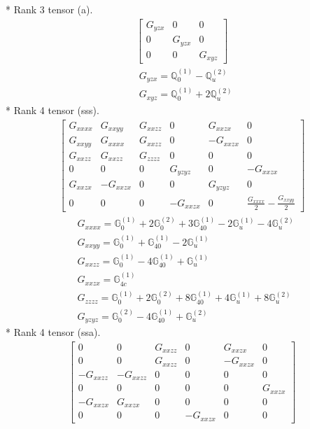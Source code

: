 \documentclass[fleqn,8pt,landscape]{jsarticle}
\begin{document}
* Rank 3 tensor (a).
\begin{align*}
\begin{bmatrix} G_{yzx} & 0 & 0 \\ 0 & G_{yzx} & 0 \\ 0 & 0 & G_{xyz} \end{bmatrix}
\end{align*}
\begin{align*}
& G_{yzx} = \mathbb{Q}_{0}^{(1)} - \mathbb{Q}_{u}^{(2)} \\
& G_{xyz} = \mathbb{Q}_{0}^{(1)} + 2 \mathbb{Q}_{u}^{(2)}
\end{align*}
* Rank 4 tensor (sss).
\begin{align*}
\begin{bmatrix} G_{xxxx} & G_{xxyy} & G_{xxzz} & 0 & G_{xxzx} & 0 \\ G_{xxyy} & G_{xxxx} & G_{xxzz} & 0 & - G_{xxzx} & 0 \\ G_{xxzz} & G_{xxzz} & G_{zzzz} & 0 & 0 & 0 \\ 0 & 0 & 0 & G_{yzyz} & 0 & - G_{xxzx} \\ G_{xxzx} & - G_{xxzx} & 0 & 0 & G_{yzyz} & 0 \\ 0 & 0 & 0 & - G_{xxzx} & 0 & \frac{G_{xxxx}}{2} - \frac{G_{xxyy}}{2} \end{bmatrix}
\end{align*}
\begin{align*}
& G_{xxxx} = \mathbb{G}_{0}^{(1)} + 2 \mathbb{G}_{0}^{(2)} + 3 \mathbb{G}_{40}^{(1)} - 2 \mathbb{G}_{u}^{(1)} - 4 \mathbb{G}_{u}^{(2)} \\
& G_{xxyy} = \mathbb{G}_{0}^{(1)} + \mathbb{G}_{40}^{(1)} - 2 \mathbb{G}_{u}^{(1)} \\
& G_{xxzz} = \mathbb{G}_{0}^{(1)} - 4 \mathbb{G}_{40}^{(1)} + \mathbb{G}_{u}^{(1)} \\
& G_{xxzx} = \mathbb{G}_{4c}^{(1)} \\
& G_{zzzz} = \mathbb{G}_{0}^{(1)} + 2 \mathbb{G}_{0}^{(2)} + 8 \mathbb{G}_{40}^{(1)} + 4 \mathbb{G}_{u}^{(1)} + 8 \mathbb{G}_{u}^{(2)} \\
& G_{yzyz} = \mathbb{G}_{0}^{(2)} - 4 \mathbb{G}_{40}^{(1)} + \mathbb{G}_{u}^{(2)}
\end{align*}
* Rank 4 tensor (ssa).
\begin{align*}
\begin{bmatrix} 0 & 0 & G_{xxzz} & 0 & G_{xxzx} & 0 \\ 0 & 0 & G_{xxzz} & 0 & - G_{xxzx} & 0 \\ - G_{xxzz} & - G_{xxzz} & 0 & 0 & 0 & 0 \\ 0 & 0 & 0 & 0 & 0 & G_{xxzx} \\ - G_{xxzx} & G_{xxzx} & 0 & 0 & 0 & 0 \\ 0 & 0 & 0 & - G_{xxzx} & 0 & 0 \end{bmatrix}
\end{align*}
\end{document}
